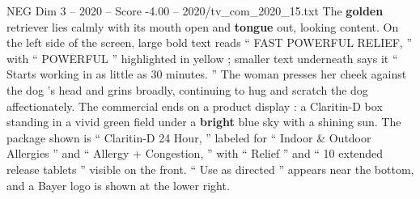\begin{textsample}{NEG Dim 3 – 2020 – Score -4.00 – 2020/tv\_com\_2020\_15.txt}
The \textbf{golden} retriever lies calmly with its mouth open and \textbf{tongue} out, looking content.
On the left side of the screen, large bold text reads “ FAST POWERFUL RELIEF, ” with “ POWERFUL ” highlighted in yellow ; smaller text underneath says it “ Starts working in as little as 30 minutes. ” The woman presses her cheek against the dog ’s head and grins broadly, continuing to hug and scratch the dog affectionately.
The commercial ends on a product display : a Claritin-D box standing in a vivid green field under a \textbf{bright} blue sky with a shining sun.
The package shown is “ Claritin-D 24 Hour, ” labeled for “ Indoor \& Outdoor Allergies ” and “ Allergy + Congestion, ” with “ Relief ” and “ 10 extended release tablets ” visible on the front. “ Use as directed ” appears near the bottom, and a Bayer logo is shown at the lower right.

\end{textsample}
